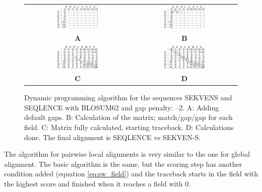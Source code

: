 \documentclass[a4paper, twoside, 12pt, openright]{report}
\begin{document}
\begin{figure}[htb]
 \begin{tabular}{cc}
 \includegraphics[width=0.4\textwidth]{fig/dynprog_example1.png} & \includegraphics[width=0.4\textwidth]{fig/dynprog_example2.png}\\
 {\bf A} & {\bf B}\\
 \includegraphics[width=0.4\textwidth]{fig/dynprog_example3.png} & \includegraphics[width=0.4\textwidth]{fig/dynprog_example4.png}\\
 {\bf C} & {\bf D}\\
 \end{tabular}
 \caption{Dynamic programming algorithm for the sequences SEKVENS and SEQLENCE with BLOSUM62 and gap penalty: --2. A: Adding default gaps. B: Calculation of the matrix; match/gap/gap for each field. C: Matrix fully calculated, starting traceback. D: Calculations done. The final alignment is SEQLENCE vs SEKVEN-S.}
 \label{fig:dynprog_example}
\end{figure}

The algorithm for pairwise local alignments is very similar to the one for global alignment\cite{smith_identification_1981}. The basic algorithm is the same, but the scoring step has another condition added (equation \ref{eq:sw_field}) and the traceback starts in the field with the highest score and finished when it reaches a field with 0.
\end{document}
